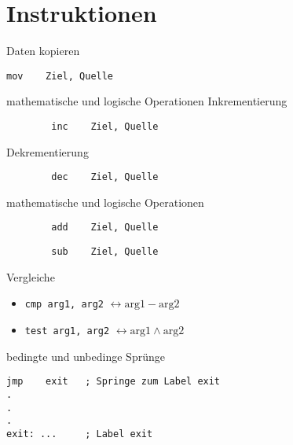 \section{Instruktionen}

\begin{frame}[fragile]{Daten kopieren}
\begin{lstlisting}
mov    Ziel, Quelle
\end{lstlisting}
\end{frame}

\begin{frame}[fragile]{mathematische und logische Operationen}
	Inkrementierung
		\begin{lstlisting}
		inc    Ziel, Quelle
		\end{lstlisting}

	Dekrementierung
		\begin{lstlisting}
		dec    Ziel, Quelle
		\end{lstlisting}
\end{frame}

\begin{frame}[fragile]{mathematische und logische Operationen}
		\begin{lstlisting}
		add    Ziel, Quelle
		\end{lstlisting}

		\begin{lstlisting}
		sub    Ziel, Quelle
		\end{lstlisting}
\end{frame}

\begin{frame}{Vergleiche}
\begin{itemize}
	\item \texttt{cmp arg1, arg2} $\leftrightarrow \text{arg1} - \text{arg2}$

	\item \texttt{test arg1, arg2} $\leftrightarrow \text{arg1} \wedge \text{arg2}$
\end{itemize}
\end{frame}

\begin{frame}[fragile]{bedingte und unbedinge Sprünge}
\begin{lstlisting}
jmp    exit   ; Springe zum Label exit
.
.
.
exit: ...     ; Label exit
\end{lstlisting}
\end{frame}

